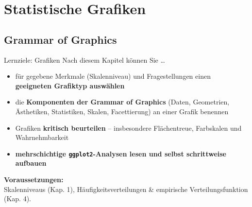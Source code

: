 \documentclass[
  10pt,
  ignorenonframetext,
]{beamer}
\providecommand{\tightlist}{%
  \setlength{\itemsep}{0pt}\setlength{\parskip}{0pt}}
\begin{document}
\hypertarget{statistische-grafiken}{%
\section{Statistische Grafiken}\label{statistische-grafiken}}

\hypertarget{grammar-of-graphics}{%
\subsection{Grammar of Graphics}\label{grammar-of-graphics}}

\begin{frame}[fragile]{Lernziele: Grafiken}
\protect\hypertarget{lernziele-grafiken}{}
Nach diesem Kapitel können Sie \ldots{}

\begin{itemize}
\tightlist
\item
  für gegebene Merkmale (Skalenniveau) und Fragestellungen einen
  \textbf{geeigneten Grafiktyp auswählen}
\item
  die \textbf{Komponenten der Grammar of Graphics} (Daten, Geometrien,
  Ästhetiken, Statistiken, Skalen, Facettierung) an einer Grafik
  benennen
\item
  Grafiken \textbf{kritisch beurteilen} -- insbesondere Flächentreue,
  Farbskalen und Wahrnehmbarkeit
\item
  \textbf{mehrschichtige \texttt{ggplot2}-Analysen lesen und selbst
  schrittweise aufbauen}
\end{itemize}

\vspace{1em}

\textbf{Voraussetzungen:}\\
Skalenniveaus (Kap. 1), Häufigkeitsverteilungen \& empirische
Verteilungsfunktion (Kap. 4).
\end{frame}
\end{document}
